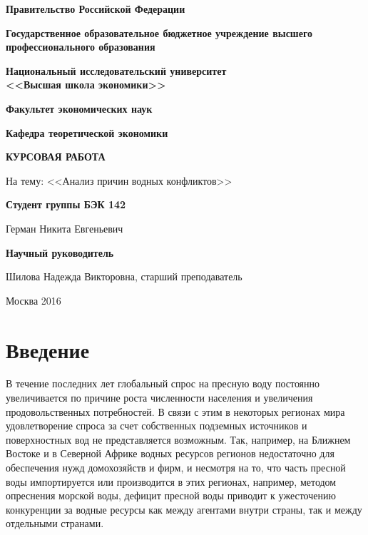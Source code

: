 \documentclass[a4paper, 12pt]{article}
\theoremstyle{plain} %
\theoremstyle{definition} %
\theoremstyle{remark} %
\begin{document}
	
	\thispagestyle{empty}
	\begin{center}
		\Large{\textbf{Правительство Российской Федерации}}
		\vspace{1ex}
		
		\large{\textbf{Государственное образовательное бюджетное учреждение 
		высшего профессионального образования}}
		\vspace{1ex}
		
		\Large{\textbf{Национальный исследовательский университет \\ <<Высшая школа экономики>>}}
	\end{center}
	\vspace{7ex}
	\large{\textbf{Факультет экономических наук}}
	
	\large{ \noindent \textbf{Кафедра теоретической экономики}}
	\vspace{10ex}
	
	\begin{center}
		\textbf{КУРСОВАЯ РАБОТА}
		
		На тему: <<Анализ причин водных конфликтов>>
	\vspace{8ex}
	\end{center}
	
	\begin{flushright}
		\noindent
		\textbf{Студент группы БЭК 142}
		
		\noindent
		Герман Никита Евгеньевич
		\vspace{2ex}
		
		\noindent
		\textbf{Научный руководитель}
		
		\noindent
		Шилова Надежда Викторовна, старший преподаватель
	\end{flushright}
	
	\begin{center}
		\vfill
		Москва 2016
	\end{center}
	
	\newpage
	\tableofcontents
	\newpage
\section{Введение}
В течение последних лет глобальный спрос на пресную воду постоянно увеличивается по причине роста численности населения и увеличения продовольственных потребностей. В связи с этим в некоторых регионах мира удовлетворение спроса за счет собственных подземных источников и поверхностных вод не представляется возможным. Так, например, на Ближнем Востоке и в Северной Африке водных ресурсов регионов недостаточно для обеспечения нужд домохозяйств и фирм, и несмотря на то, что часть пресной воды импортируется или производится в этих регионах, например, методом опреснения морской воды, дефицит пресной воды приводит к ужесточению конкуренции за водные ресурсы как между агентами внутри страны, так и между отдельными странами.
\end{document}
